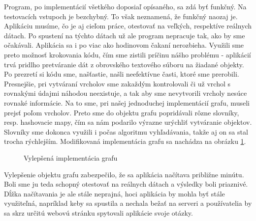 Program, po implementácií všetkého doposiaľ opísaného, sa zdá byť funkčný. Na testovacích vstupoch je bezchybný. To však neznamená, že funkčný naozaj je. Aplikáciu musíme, čo je aj cieľom práce, otestovať na veľkých, respektíve reálnych dátach. Po spustení na týchto dátach už ale program nepracuje tak, ako by sme očakávali. Aplikácia sa i po viac ako hodinovom čakaní nerozbieha. Využili sme preto možnosť krokovania kódu, čím sme zistili príčinu nášho problému - aplikácií trvá pridlho pretváranie dát z obrovského textového súboru na žiadané objekty. Po prezretí si kódu sme, našťastie, našli neefektívne časti, ktoré sme prerobili. Presnejšie, pri vytváraní vrcholov sme zakaždým kontrolovali či už vrchol s rovnakými údajmi náhodou neexistuje, a tak aby sme nevytvorili vrcholy nesúce rovnaké informácie. Na to sme, pri našej jednoduchej implementácií grafu, museli prejsť poľom vrcholov. Preto sme do objektu grafu popridávali rôzne slovníky, resp. hashovacie mapy, čím sa nám podarilo výrazne urýchliť vytváranie objektov. Slovníky sme dokonca využili i počas algoritmu vyhľadávania, takže aj on sa stal trocha rýchlejším. Modifikovaná implementácia grafu sa nachádza na obrázku \ref{4_Graph}.\newline

\begin{figure}[H]
  \caption{Vylepšená implementácia grafu}
  \label{4_Graph}
\end{figure}

Vylepšenie objektu grafu zabezpečilo, že sa aplikácia načítava približne minútu. Boli sme ju teda schopný otestovať na reálnych dátach a výsledky boli priaznivé. Dĺžka načítavania je ale stále neprajná, hoci aplikácia by mohla byť stále využiteľná, napríklad keby sa spustila a nechala bežať na serveri a používatelia by sa skrz určitú webovú stránku spytovali aplikácie svoje otázky.\newline


